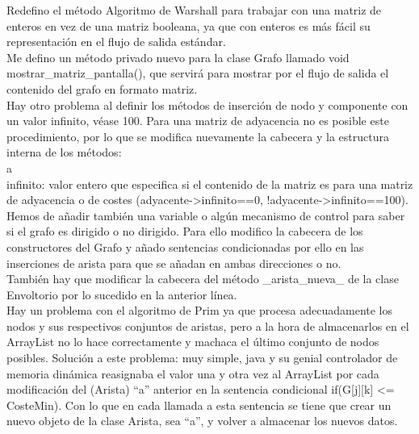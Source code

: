 \begin{itemize}
Redefino el método Algoritmo de Warshall para trabajar con una matriz de enteros en vez de una matriz booleana, ya que con enteros es más fácil su representación en el flujo de salida estándar.\\

Me defino un método privado nuevo para la clase Grafo llamado void mostrar\_matriz\_pantalla(), que servirá para mostrar por el flujo de salida el contenido del grafo en formato matriz.\\

Hay otro problema al definir los métodos de inserción de nodo y componente con un valor infinito, véase 100. Para una matriz de adyacencia no es posible este procedimiento, por lo que se modifica nuevamente la cabecera y la estructura interna de los métodos:\\



a\\



infinito: valor entero que especifica si el contenido de la matriz es para una matriz de adyacencia o de costes (adyacente->infinito==0, !adyacente->infinito==100).\\

Hemos de añadir también una variable o algún mecanismo de control para saber si el grafo es dirigido o no dirigido. Para ello modifico la cabecera de los constructores del Grafo y añado sentencias condicionadas por ello en las inserciones de arista para que se añadan en ambas direcciones o no.\\

También hay que modificar la cabecera del método \_arista\_nueva\_ de la clase Envoltorio por lo sucedido en la anterior línea.\\



Hay un problema con el algoritmo de Prim ya que procesa adecuadamente los nodos y sus respectivos conjuntos de aristas, pero a la hora de almacenarlos en el ArrayList no lo hace correctamente y machaca el último conjunto de nodos posibles.
Solución a este problema: muy simple, java y su genial controlador de memoria dinámica reasignaba el valor una y otra vez al ArrayList por cada modificación del (Arista) ``a'' anterior en la sentencia condicional if(G[j][k] <= CosteMin). Con lo que en cada llamada a esta sentencia se tiene que crear un nuevo objeto de la clase Arista, sea ``a'', y volver a almacenar los nuevos datos.\\


\end{itemize}
